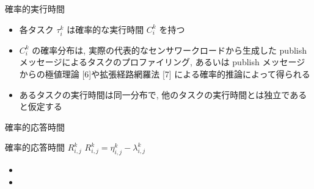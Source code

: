 \begin{frame}{確率的実行時間}
    \begin{itemize}
        \item 各タスク $\tau_{i}^{k}$ は確率的な実行時間 $C_{i}^{k}$ を持つ
        \item $C_{i}^{k}$ の確率分布は, 実際の代表的なセンサワークロードから生成した publish メッセージによるタスクのプロファイリング, あるいは publish メッセージからの極値理論 [6]や拡張経路網羅法 [7] による確率的推論によって得られる
        \item あるタスクの実行時間は同一分布で, 他のタスクの実行時間とは独立であると仮定する
    \end{itemize}
\end{frame}

\begin{frame}{確率的応答時間}
    \begin{block}{確率的応答時間 $R_{i, j}^{k}$}
        $R_{i, j}^{k} = \eta_{i, j}^{k}-\lambda_{i, j}^{k}$
        \setlength{\linewidth}{0.98\columnwidth}
        \begin{itemize}
            \item {}
            \item {}
        \end{itemize}
    \end{block}
\end{frame}



